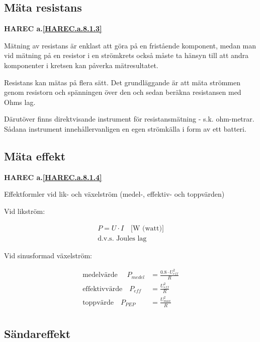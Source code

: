 \subsection{Mäta resistans}
\textbf{
HAREC a.\ref{HAREC.a.8.1.3}\label{myHAREC.a.8.1.3}
}

Mätning av resistans är enklast att göra på en fristående komponent,
medan man vid mätning på en resistor i en strömkrets också måste ta
hänsyn till att andra komponenter i kretsen kan påverka mätresultatet.

Resistans kan mätas på flera sätt. Det grundläggande är att mäta
strömmen genom resistorn och spänningen över den och sedan beräkna
resistansen med Ohms lag.

Därutöver finns direktvisande instrument för resistansmätning -
s.k. ohm-metrar. Sådana instrument innehållervanligen en egen
strömkälla i form av ett batteri.


\subsection{Mäta effekt}
\textbf{
HAREC a.\ref{HAREC.a.8.1.4}\label{myHAREC.a.8.1.4}
}
\label{mätaeffekt}

Effektformler vid lik- och växelström (medel-, effektiv- och
toppvärden)

Vid likström:

\begin{gather*}
P = U \cdot I \quad \text{[W (watt)]} \\
\text{d.v.s. Joules lag}
\end{gather*}

Vid sinusformad växelström:

\begin{align*}
  \text{medelvärde   } \quad P_{medel} &= \frac{0.8\cdot U_{eff}^2}{R} \\
  \text{effektivvärde} \quad   P_{eff} &= \frac{U_{eff}^2}{R} \\
  \text{toppvärde}     \quad   P_{PEP} &= \frac{U_{max}^2}{R} \\
\end{align*}

\subsection{Sändareffekt}

